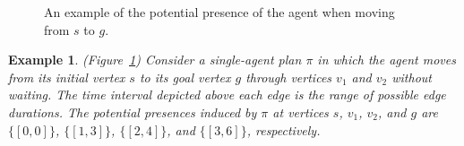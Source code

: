 \documentclass[jair,twoside,11pt,theapa]{article}
\newcommand{\vertexpath}{\pi}
\newtheorem{example}{Example}
\begin{document}
%
\begin{figure}[ht]
\centering
{}

\caption
{An example of the potential presence of the agent when moving from $s$ to $g$.}
\label{fig:potential-presence-ex}
\end{figure}
%
\begin{example}
(Figure~\ref{fig:potential-presence-ex}) Consider a single-agent plan $\pi$ in which the agent moves from its initial vertex $s$ to its goal vertex $g$ through vertices $v_1$ and $v_2$ without waiting. 
The time interval depicted above each edge is the range of possible edge durations. 
The \emph{potential presences} induced by $\vertexpath$ at vertices $s$, $v_1$, $v_2$, and $g$ are $\{[0, 0]\}$, $\{[1,3]\}$, $\{[2,4]\}$, and $\{[3,6]\}$, respectively. 
\end{example}


\end{document}
